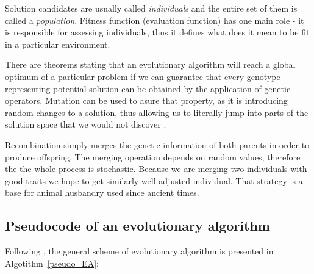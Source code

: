 Solution candidates are usually called \emph{individuals} and the entire set of them is called a \emph{population}. 
Fitness function (evaluation function) has one main role - it is responsible for assessing individuals, thus it defines what does it mean to be fit in a particular
environment.

There are theorems stating that an evolutionary algorithm will reach a global optimum of a particular problem if we can guarantee that every genotype representing
potential solution can be obtained by the application of genetic operators.
Mutation can be used to asure that property, as it is introducing random changes to a solution, thus allowing us to literally jump into parts of the solution space
that we would not discover \cite{evo}.       

Recombination simply merges the genetic information of both parents in order to produce offspring.
The merging operation depends on random values, therefore the the whole process is stochastic.
Because we are merging two individuals with good traits we hope to get similarly well adjusted individual.
That strategy is a base for animal husbandry used since ancient times.
   

\subsection{Pseudocode of an evolutionary algorithm}

Following \cite{evo}, the general scheme of evolutionary algorithm is presented in Algotithm~\ref{pseudo_EA}:
 
% 
% 
% 


